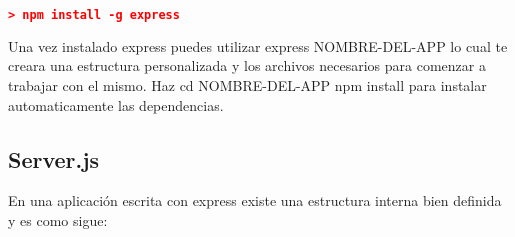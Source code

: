 \begin{lstlisting}[language=JSON] 
    > npm install -g express
\end{lstlisting}

Una vez instalado express puedes utilizar express NOMBRE-DEL-APP lo cual te creara una estructura personalizada y los archivos necesarios para comenzar a trabajar con el mismo. Haz cd NOMBRE-DEL-APP npm install para instalar automaticamente las dependencias.

\subsection{Server.js}

En una aplicación escrita con express existe una estructura interna bien definida y es como sigue:


